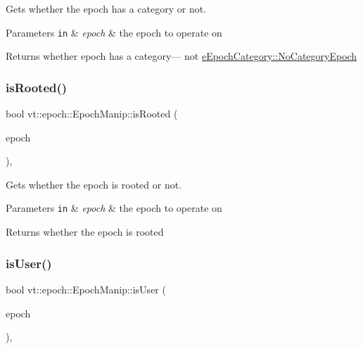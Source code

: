 Gets whether the epoch has a category or not. 


\begin{DoxyParams}[1]{Parameters}
\mbox{\tt in}  & {\em epoch} & the epoch to operate on\\
\hline
\end{DoxyParams}
\begin{DoxyReturn}{Returns}
whether {\ttfamily epoch} has a category--- not {\ttfamily \hyperlink{namespacevt_1_1epoch_a956abe0aceef0d10a988de8acb002c7caa6136714a068313660a40ae6bd15410c}{e\+Epoch\+Category\+::\+No\+Category\+Epoch}} 
\end{DoxyReturn}
\mbox{\label{structvt_1_1epoch_1_1_epoch_manip_a00210a34334fb86984cfbd08bae74929}} 
\subsubsection{\texorpdfstring{is\+Rooted()}{isRooted()}}
{\footnotesize\ttfamily bool vt\+::epoch\+::\+Epoch\+Manip\+::is\+Rooted (\begin{DoxyParamCaption}\item[{\hyperlink{namespacevt_a985a5adf291c34a3ca263b3378388236}{Epoch\+Type} const \&}]{epoch }\end{DoxyParamCaption})\hspace{0.3cm}{\ttfamily [inline]}, {\ttfamily [static]}}



Gets whether the epoch is rooted or not. 


\begin{DoxyParams}[1]{Parameters}
\mbox{\tt in}  & {\em epoch} & the epoch to operate on\\
\hline
\end{DoxyParams}
\begin{DoxyReturn}{Returns}
whether the {\ttfamily epoch} is rooted 
\end{DoxyReturn}
\mbox{\label{structvt_1_1epoch_1_1_epoch_manip_afb2b55c1d422512bc266f04e1aff7904}} 
\subsubsection{\texorpdfstring{is\+User()}{isUser()}}
{\footnotesize\ttfamily bool vt\+::epoch\+::\+Epoch\+Manip\+::is\+User (\begin{DoxyParamCaption}\item[{\hyperlink{namespacevt_a985a5adf291c34a3ca263b3378388236}{Epoch\+Type} const \&}]{epoch }\end{DoxyParamCaption})\hspace{0.3cm}{\ttfamily [inline]}, {\ttfamily [static]}}



